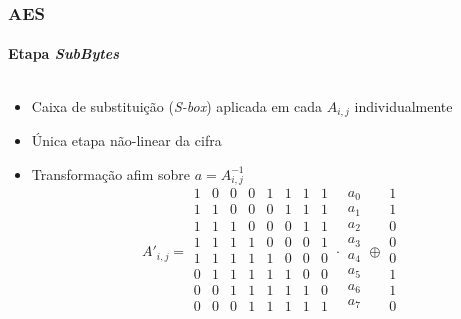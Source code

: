 \documentclass[12pt]{beamer}
\begin{document}
\begin{frame}
    \frametitle{AES}
    \framesubtitle{Etapa \emph{SubBytes}}
    \begin{columns}[T]
        \begin{column}{.7\textwidth}
          \begin{itemize}
                \item Caixa de substituição (\emph{S-box}) aplicada em cada $A_{i,j}$ individualmente
                \item Única etapa não-linear da cifra
                \item Transformação afim sobre $a = A^{-1}_{i,j}$
                    \begin{equation*}
                        A'_{i,j} = 
                        \begin{smallmatrix}
                        1 & 0 & 0 & 0 & 1 & 1 & 1 & 1 \\
                        1 & 1 & 0 & 0 & 0 & 1 & 1 & 1 \\
                        1 & 1 & 1 & 0 & 0 & 0 & 1 & 1 \\
                        1 & 1 & 1 & 1 & 0 & 0 & 0 & 1 \\
                        1 & 1 & 1 & 1 & 1 & 0 & 0 & 0 \\
                        0 & 1 & 1 & 1 & 1 & 1 & 0 & 0 \\
                        0 & 0 & 1 & 1 & 1 & 1 & 1 & 0 \\
                        0 & 0 & 0 & 1 & 1 & 1 & 1 & 1 \\
                        \end{smallmatrix} \cdot
                        \begin{smallmatrix}
                        a_0 \\ a_1 \\ a_2 \\ a_3 \\ a_4 \\ a_5 \\ a_6 \\ a_7 \\
                        \end{smallmatrix}
                        \oplus
                        \begin{smallmatrix}
                        1 \\ 1 \\ 0 \\ 0 \\ 0 \\ 1 \\ 1 \\ 0 \\

\end{smallmatrix}
\end{equation*}
\end{itemize}
\end{column}
\end{columns}
\end{frame}
\end{document}
